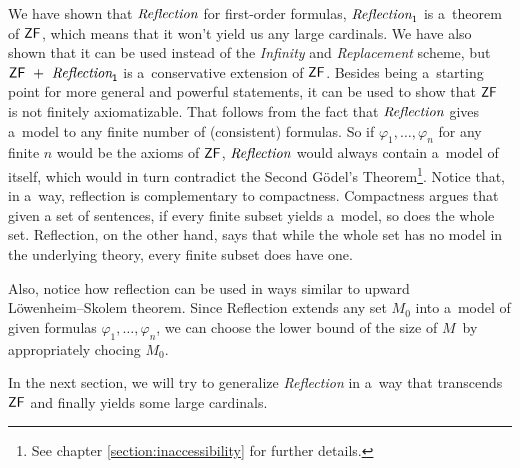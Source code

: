 We have shown that $\emph{Reflection}$ for first-order formulas, $\emph{Reflection}_1$ is a~theorem of $\sf{ZF}$, which means that it won't yield us any large cardinals. We have also shown that it can be used instead of the \emph{Infinity} and \emph{Replacement} scheme, but $\sf{ZF}\ +\ \emph{Reflection}_1$ is a~conservative extension of $\sf{ZF}$. Besides being a~starting point for more general and powerful statements, it can be used to show that $\sf{ZF}$ is not finitely axiomatizable. That follows from the fact that $\emph{Reflection}$ gives a~model to any finite number of (consistent) formulas. So if $\varphi_1, \ldots, \varphi_n$ for any finite $n$ would be the axioms of $\sf{ZF}$, $\emph{Reflection}$ would always contain a~model of itself, which would in turn contradict the Second Gödel's Theorem\footnote{See chapter \ref{section:inaccessibility} for further details.}.
Notice that, in a~way, reflection is complementary to compactness. Compactness argues that given a set of sentences, if every finite subset yields a~model, so does the whole set. Reflection, on the other hand, says that while the whole set has no model in the underlying theory, every finite subset does have one.

Also, notice how reflection can be used in ways similar to upward\\
Löwenheim–Skolem theorem. Since Reflection extends any set $M_0$ into a~model of given formulas $\varphi_1, \ldots, \varphi_n$, we can choose the lower bound of the size of $M$ by appropriately chocing $M_0$.

In the next section, we will try to generalize \emph{Reflection} in a~way that transcends $\sf{ZF}$ and finally yields some large cardinals.
\newpage
